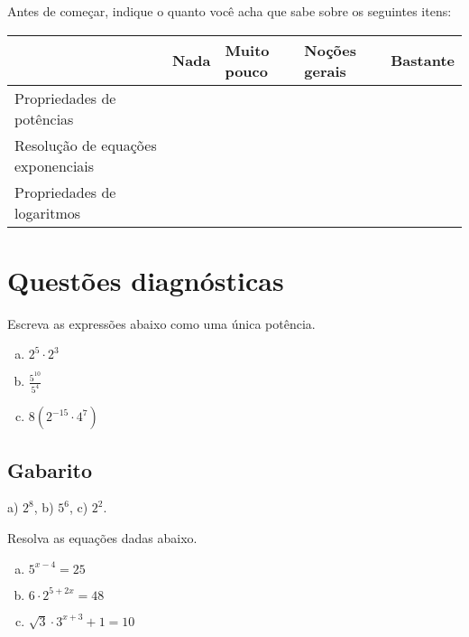 \documentclass[main.tex]{subfiles}
\begin{document}
\paraFolhaAvaliacoes

Antes de começar, indique o quanto você acha que sabe sobre os seguintes itens:

\begin{center}
 \begin{tabular}{|p{35mm}||p{15mm}|p{15mm}|p{15mm}|p{15mm}|} 
 \hline
   & Nada & Muito pouco & Noções gerais & Bastante\\
 \hline
 Propriedades de potências &  &  &  &  \\ 
 \hline
 Resolução de equações exponenciais&  &  &  &  \\
 \hline
 Propriedades de logaritmos &  &  &  &  \\
 \hline
\end{tabular}
\end{center}

\paraAmbos

\section{Questões diagnósticas}

\begin{diagnostico}
Escreva as expressões abaixo como uma única potência.
\begin{enumerate}[a)]
  \item $2^5 \cdot 2^3$
  \item $\frac{5^{10}}{5^4}$
  \item $8(2^{-15} \cdot 4^7)$
\end{enumerate}
\end{diagnostico}

\paraTutores

\subsection{Gabarito}

a) $2^8$, b) $5^6$, c) $2^2$.

\paraAmbos
  
\begin{diagnostico}
Resolva as equações dadas abaixo.
\begin{enumerate}[a)]
  \item $5^{x-4}=25$
  \item $6 \cdot 2^{5+2x}=48$
  \item $\sqrt{3} \cdot 3^{x+3}+1=10$
\end{enumerate}
\end{diagnostico}
\end{document}
